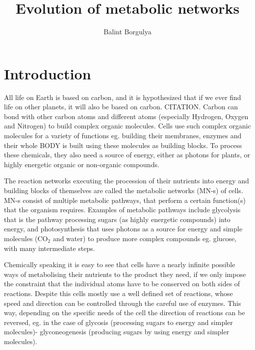\documentclass[10pt,a4paper]{article}
\title{Evolution of metabolic networks}
\author{Balint Borgulya}
\begin{document}
	
	
	
	\maketitle
	
	\begin{abstract}
		
	\end{abstract}
	
	\section{Introduction}

	All life on Earth is based on carbon, and it is hypothesized that if we ever find life on other planets, it will also be based on carbon. CITATION. Carbon can bond with other carbon atoms and different atoms (especially Hydrogen, Oxygen and Nitrogen) to build complex organic molecules. Cells use such complex organic molecules for a variety of functions eg. building their membranes, enzymes and their whole BODY is built using these molecules as building blocks. To process these chemicals, they also need a source of energy, either as photons for plants, or highly energetic organic or non-organic compounds. 

	The reaction networks executing the procession of their nutrients into energy and building blocks of themselves are called the metabolic networks (MN-s) of cells.  MN-s consist of multiple metabolic pathways, that perform a certain function(s) that the organism requires. Examples of metabolic pathways include glycolysis that is the pathway processing sugars (as highly energetic compounds) into energy,  and photosynthesis that uses photons as a source for energy and simple molecules (CO$_2$ and water) to produce more complex compounds eg. glucose, with many intermediate steps. 
	
	Chemically speaking it is easy to see that cells have  a nearly infinite possible ways of metabolising their nutrients to the product they need, if we only impose the constraint that the individual atoms have to be conserved on both sides of reactions.  Despite this cells mostly use a well defined set of reactions, whose speed and direction can be controlled through the careful use of enzymes. This way, depending on the specific needs of the cell the direction of reactions can be reversed, eg. in the case of glycosis (processing sugars to energy and simpler molecules)- glyconeogenesis (producing sugars by using energy and simpler molecules). 
	
\end{document}
